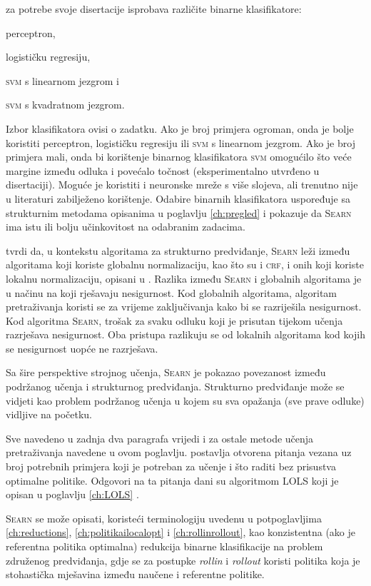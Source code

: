 \citeauthor{daume06thesis} za potrebe svoje disertacije isprobava različite
binarne klasifikatore:
\begin{inlinelist}
  \item perceptron,
  \item logističku regresiju,
  \item \textsc{svm} s linearnom jezgrom i
  \item \textsc{svm} s kvadratnom jezgrom.
\end{inlinelist}
Izbor klasifikatora ovisi o zadatku. Ako je broj primjera ogroman, onda je bolje
koristiti perceptron, logističku regresiju ili \textsc{svm} s linearnom jezgrom.
Ako je broj primjera mali, onda bi korištenje binarnog klasifikatora
\textsc{svm} omogućilo što veće margine između odluka i povećalo točnost
(eksperimentalno utvrđeno u disertaciji). Moguće je koristiti i neuronske mreže
s više slojeva, ali trenutno nije u literaturi zabilježeno korištenje. Odabire
binarnih klasifikatora \citeauthor{daume06thesis} uspoređuje sa strukturnim
metodama opisanima u poglavlju \ref{ch:pregled} i pokazuje da \textsc{Searn} ima
istu ili bolju učinkovitost na odabranim zadacima.

\citeauthor{daume06thesis} tvrdi da, u kontekstu algoritama za strukturno
predviđanje, \textsc{Searn} leži između algoritama koji koriste globalnu
normalizaciju, kao što su \mmmm{} i \textsc{crf}, i onih koji koriste lokalnu
normalizaciju, opisani u \citep{punyakanok2001use}. Razlika između
\textsc{Searn} i globalnih algoritama je u načinu na koji rješavaju nesigurnost.
Kod globalnih algoritama, algoritam pretraživanja koristi se za vrijeme
zaključivanja kako bi se razriješila nesigurnost. Kod algoritma \textsc{Searn},
trošak za svaku odluku koji je prisutan tijekom učenja razrješava nesigurnost.
Oba pristupa razlikuju se od lokalnih algoritama kod kojih se nesigurnost uopće
ne razrješava.

Sa šire perspektive strojnog učenja, \textsc{Searn} je pokazao povezanost između
podržanog učenja i strukturnog predviđanja. Strukturno predviđanje može se
vidjeti kao problem podržanog učenja u kojem su sva opažanja (sve prave odluke)
vidljive na početku.

Sve navedeno u zadnja dva paragrafa vrijedi i za ostale metode učenja
pretraživanja navedene u ovom poglavlju. \citeauthor{daume06thesis} postavlja
otvorena pitanja vezana uz broj potrebnih primjera koji je potreban za učenje i
što raditi bez prisustva optimalne politike. Odgovori na ta pitanja dani su
algoritmom \textsc{LOLS} koji je opisan u poglavlju \ref{ch:LOLS}
\citep{daume15lols}.

\textsc{Searn} se može opisati, koristeći terminologiju uvedenu u potpoglavljima
\ref{ch:reductions}, \ref{ch:politikailocalopt} i \ref{ch:rollinrollout}, kao
konzistentna (ako je referentna politika optimalna) redukcija binarne
klasifikacije na problem združenog predviđanja, gdje se za postupke
\textit{rollin} i \textit{rollout} koristi politika koja je stohastička
mješavina između naučene i referentne politike.
